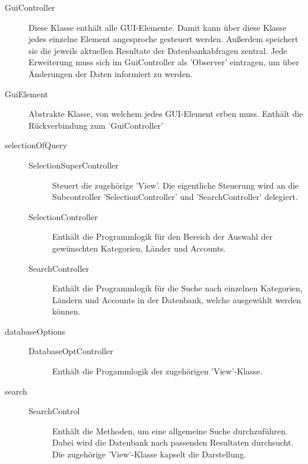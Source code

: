 \begin{description}
	
	\item[GuiController] Diese Klasse enthält alle GUI-Elemente. Damit kann über diese Klasse jedes einzelne Element angesproche gesteuert werden. Außerdem speichert sie die jeweils aktuellen Resultate der Datenbankabfragen zentral. Jede Erweiterung muss sich im GuiController als 'Observer' eintragen, um über Änderungen der Daten informiert zu werden. 
	\item[GuiElement] Abstrakte Klasse, von welchem jedes GUI-Element erben muss. Enthält die Rückverbindung zum 'GuiController'
	\item[selectionOfQuery]  
	\quad
		 \begin{description}  	
		\item[SelectionSuperController] Steuert die zugehörige 'View'. Die eigentliche Steuerung wird an die Subcontroller 'SelectionController' und 'SearchController' delegiert.
		\item[SelectionController] Enthält die Programmlogik für den Bereich der Auswahl der gewünschten Kategorien, Länder und Accounts.
		\item[SearchController] Enthält die Programmlogik für die Suche nach einzelnen Kategorien, Ländern und Accounts in der Datenbank, welche ausgewählt werden können. 
		
		\end{description}
	\item[databaseOptions] 	\quad
		\begin{description}
			\item[DatabaseOptController] Enthält die Progammlogik der zugehörigen 'View'-Klasse.
		\end{description}
	\item[search] \quad
		\begin{description}
			\item[SearchControl] Enthält die Methoden, um eine allgemeine Suche durchzuführen. Dabei wird die Datenbank nach passenden Resultaten durchsucht. Die zugehörige 'View'-Klasse kapselt die Darstellung.
		\end{description}
		

\end{description}
